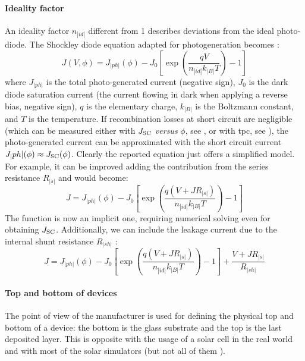 		\paragraph{Ideality factor} An ideality factor $n_|id|$ different from 1 describes deviations from the ideal photo-diode.
		The Shockley diode equation adapted for photogeneration becomes \cite{Calado2018b}:
		\begin{equation} \label{eq:photodiode}
			J(V,\phi) = J_|ph|(\phi) - J_0\left[\exp(\frac{qV}{n_|id|k_|B|T})-1\right]
		\end{equation}
		where $J_|ph|$ is the total photo\hyp{}generated current (negative sign), $J_0$ is the dark diode saturation current (the current flowing in dark when applying a reverse bias, negative sign), $q$ is the elementary charge, $k_|B|$ is the Boltzmann constant, and $T$ is the temperature.
		If recombination losses at short circuit are negligible (which can be measured either with $J_\mathrm{SC}$ \textsl{versus} $\phi$, see , or with \gls{tpc}, see ), the photo\hyp{}generated current can be approximated with the short circuit current $J_|ph|(\phi) \approx J_\mathrm{SC}(\phi)$.
		Clearly the reported equation just offers a simplified model.
		For example, it can be improved adding the contribution from the series resistance $R_|s|$ and would become:
		\begin{equation}
		J = J_|ph|(\phi) - J_0\left[\exp(\frac{q(V+JR_|s|)}{n_|id|k_|B|T})-1\right]
		\end{equation}
		The function is now an implicit one, requiring numerical solving even for obtaining $J_\mathrm{SC}$.
		Additionally, we can include the leakage current due to the internal shunt resistance $R_|sh|$ \cite{Nelson2003}:
		\begin{equation}
		J = J_|ph|(\phi) - J_0\left[\exp(\frac{q(V+JR_|s|)}{n_|id|k_|B|T})-1\right] + \frac{V+JR_|s|}{R_|sh|}
		\end{equation}
		
		\paragraph{Top and bottom of devices} The point of view of the manufacturer is used for defining the physical top and bottom of a device: the bottom is the glass substrate and the top is the last deposited layer.
		This is opposite with the usage of a solar cell in the real world and with most of the solar simulators (but not all of them 
		 \cite{Fluxim}).

